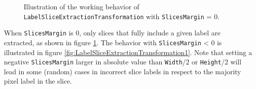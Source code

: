 \documentclass[a4paper,11pt,oneside]{article}
\begin{document}
\begin{figure}[!htb]
  \centering
  \qquad
  \caption{Illustration of the working behavior of \lstinline[basicstyle=\ttfamily\bfseries]!LabelSliceExtractionTransformation! with \lstinline!SlicesMargin! = 0.}
  \label{fig:LabelSliceExtractionTransformation0}
\end{figure}


When \lstinline!SlicesMargin! is 0, only slices that fully include a given label are extracted, as shown in figure \ref{fig:LabelSliceExtractionTransformation0}. The behavior with \lstinline!SlicesMargin! < 0 is illustrated in figure \ref{fig:LabelSliceExtractionTransformation1}. Note that setting a negative \lstinline!SlicesMargin! larger in absolute value than \lstinline!Width!/2 or \lstinline!Height!/2 will lead in some (random) cases in incorrect slice labels in respect to the majority pixel label in the slice.
\end{document}
